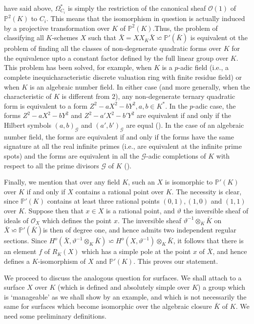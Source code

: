 have said above, $\Omega^{*}_{C_i}$ is simply the restriction of the
canonical sheaf $\mathscr{O}(1)$ of $\mathbb{P}^2(K)$ to $C_i$. This
means that the isomorphism in question is actually induced by a
projective transformation over $K$ of $\mathbb{P}^2(K)$.\pageoriginale  Thus, the
problem of classifying all $K$-schemes $X$ such that $\bar{X} = X X_K
\bar{X} \backsimeq \mathbb{P}'(\bar{K})$ is equivalent ot the
problem of finding all the classes of non-degenerate quadratic forms
over $K$ for the equivalence upto a constant factor defined by the
full linear group over $K$. This problem has been solved, for example,
when $K$ is a $p$-adic field (i.e., a complete inequicharacteristic
discrete valuation ring with finite residue field) or when $K$ is an
algebraic number field. In either case (and more generally, when the
characteristic of $K$ is different from $2$), any non-degenerate
ternary quadratic form is equivalent to a form $Z^2- a X^2 - b Y^2, a,
b \in K^*$. In the $p$-adic case, the forms $Z^2- a X^2 - b Y^2$ and
$Z^2- a' X^2 - b' Y^2$ are equivalent if and only if the Hilbert
symbols $(a, b)_{\mathscr{G}}$ and $(a', b')_{\mathscr{G}}$ are equal
(\cite{key10}). In the case of an algebraic number field, the forms are
equivalent if and only if the forms have the same signature at all the real
infinite primes (i.e., are equivalent at the infinite prime spots)
and the forms are equivalent in all the $\mathscr{G}$-adic completions
of $K$ with respect to all the prime divisors $\mathscr{G}$ of $K$
(\cite{key10}).  

Finally, we mention that over any field $K$, such an $X$ is isomorphic
to $\mathbb{P}'(K)$  over $K$ if and only if $X$ contains a rational
point over $K$. The necessity is clear, since $\mathbb{P}'(K)$
contains at least three rational points $(0,1),(1,0)$ and $(1,1)$ over
$K$. Suppose then that $x \in X$ is a rational point, and $\vartheta$
the inversible sheaf of ideals of $\mathscr{O}_X$ which defines the
point $x$. The inversible sheaf $\vartheta^{-1} \otimes_K \bar{K}$ on
$\bar{X} \backsimeq \mathbb{P}'(\bar{K})$\pageoriginale is then of
degree one, and 
hence admits two independent regular sections. Since $H^o (\bar{X},
\vartheta^{-1} \otimes_K \bar{K}) \backsimeq H^o (X, \vartheta^{-1})
\otimes_K \bar{K}$, it follows that there is an element $f$ of
$R_K(X)$ which has a simple pole at the point $x$ of $\bar{X}$, and
hence defines a $K$-isomorphism of $X$ and $\mathbb{P}'(K)$. This
proves our statement. 

We proceed to discuss the analogous question for surfaces. We shall
attach to a surface $X$ over $K$ (which is defined and absolutely
simple over $K$) a group which is `manageable' as we shall show by an
example, and which is not necessarily the same for surfaces which
become isomorphic over the algebraic closure $\bar{K}$ of $K$. We need
some preliminary definitions. 

